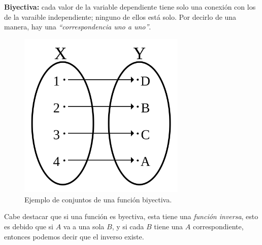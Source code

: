 \documentclass[letterpaper, 12pt]{article}
\begin{document}
        \textbf{Biyectiva: }cada valor de la variable dependiente tiene solo una conexión con los de la varaible independiente; ninguno de ellos está solo. Por decirlo de una manera, hay una \emph{``correspondencia uno a uno''}.
        \begin{figure}[H]
            \centering
            \includegraphics[width=8cm]{biyective.png}
            \caption{Ejemplo de conjuntos de una función biyectiva.}
        \end{figure}
        Cabe destacar que si una función es byectiva, esta tiene una \emph{función inversa}, esto es debido que si \(A\) va a una sola \(B\), y si cada \(B\) tiene una \(A\) correspondiente, entonces podemos decir que el inverso existe.
\end{document}
